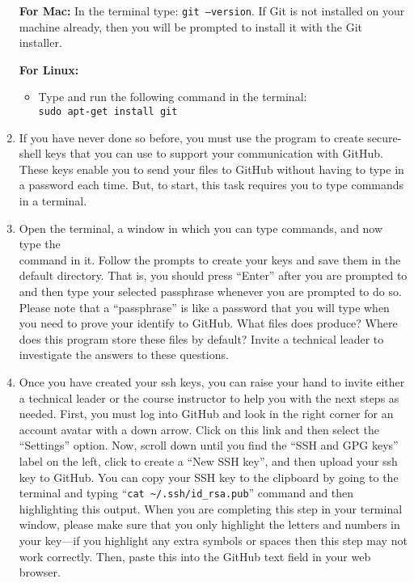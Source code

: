 \begin{enumerate}
  \textbf{For Mac:} In the terminal type: {\tt git --version}. If Git is not installed on your machine already, then you will be prompted to install it with the Git installer.
  
  \textbf{For Linux:} 
  \begin{itemize}
  	\item 
  	Type and run the following command in the terminal: \\
  	{\tt sudo apt-get install git}
  \end{itemize}

  \item If you have never done so before, you must use the  program to create secure-shell keys that
    you can use to support your communication with GitHub. These keys enable you to send your files to GitHub without having to type in a password each time.  But, to start, this task requires you to type commands in a terminal. 

  \item Open the terminal, a window in which you can type commands, and now type the \\
   command in it. Follow
    the prompts to create your keys and save them in the default directory. That is, you should press ``Enter'' after
    you are prompted to  and then type your selected passphrase
    whenever you are prompted to do so. Please note that a ``passphrase'' is like a password that you will type when you
    need to prove your identify to GitHub. What files does  produce? Where does this program store
    these files by default? Invite a technical leader to investigate the answers to these questions.

  \item Once you have created your ssh keys, you can raise your hand to invite either a technical leader or the
    course instructor to help you with the next steps as needed. First, you must log into GitHub and look in the right corner for
    an account avatar with a down arrow. Click on this link  and then select the ``Settings'' option. Now, scroll down until you find the ``SSH and GPG keys'' label on the left, click to create a ``New SSH key'', and then upload your
    ssh key to GitHub. You can copy your SSH key to the clipboard by going to the terminal and typing ``{\tt cat
    \textasciitilde{}/.ssh/id\_rsa.pub}'' command and then highlighting this output. When you are completing this step
    in your terminal window, please make sure that you only highlight the letters and numbers in your key---if you
    highlight any extra symbols or spaces then this step may not work correctly. Then, paste this into the GitHub text
    field in your web browser.


\end{enumerate}
